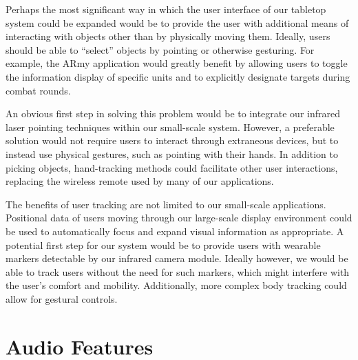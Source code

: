 \documentclass{thesis}
\begin{document}
Perhaps the most significant way in which the user interface of our tabletop system could be expanded would be to provide the user with additional means of interacting with objects other than by physically moving them. Ideally, users should be able to ``select'' objects by pointing or otherwise gesturing. For example, the ARmy application would greatly benefit by allowing users to toggle the information display of specific units and to explicitly designate targets during combat rounds.

An obvious first step in solving this problem would be to integrate our infrared laser pointing techniques within our small-scale system. However, a preferable solution would not require users to interact through extraneous devices, but to instead use physical gestures, such as pointing with their hands. In addition to picking objects, hand-tracking methods could facilitate other user interactions, replacing the wireless remote used by many of our applications. 

The benefits of user tracking are not limited to our small-scale applications. Positional data of users moving through our large-scale display environment could be used to automatically focus and expand visual information as appropriate. A potential first step for our system would be to provide users with wearable markers detectable by our infrared camera module. Ideally however, we would be able to track users without the need for such markers, which might interfere with the user's comfort and mobility. Additionally, more complex body tracking could allow for gestural controls.


\section{Audio Features}
\end{document}
